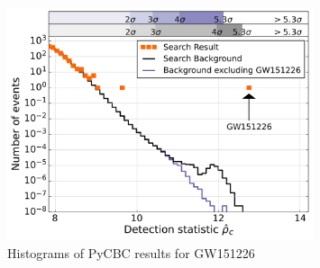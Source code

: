 \begin{figure}[ht!]%
\includegraphics[width=0.8\textwidth]{figures/O1/pycbc_hist_GW151226}
\caption[PyCBC result histograms for GW151226]{Histograms of PyCBC results for GW151226}
\label{fig:pycbc-hist-gw151226}
\end{figure}

